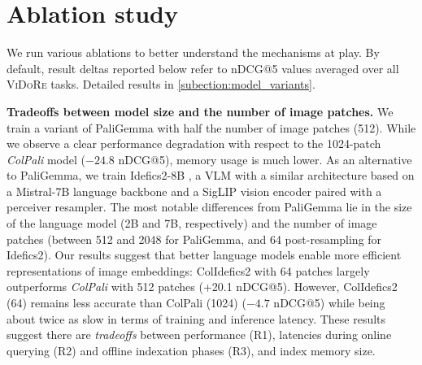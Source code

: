 \section{Ablation study}
\label{section:ablation_study}

We run various ablations to better understand the mechanisms at play. By default, result deltas reported below refer to nDCG@5 values averaged over all \textsc{ViDoRe} tasks.  Detailed results in \ref{subection:model_variants}.


\noindent\textbf{Tradeoffs between model size and the number of image patches.} We train a variant of PaliGemma with half the number of image patches (512). %
While we observe a clear performance degradation with respect to the 1024-patch \textit{ColPali} model ($-24.8$ nDCG@5), memory usage is much lower.
As an alternative to PaliGemma, we train Idefics2-8B , a VLM with a similar architecture based on a Mistral-7B  language backbone and a SigLIP vision encoder paired with a perceiver resampler. The most notable differences from PaliGemma lie in the size of the language model (2B and 7B, respectively) and the number of image patches (between 512 and 2048 for PaliGemma, and 64 post-resampling for Idefics2). Our results suggest that better language models enable more efficient representations of image embeddings: ColIdefics2 with 64 patches largely outperforms \textit{ColPali} with 512 patches (+20.1 nDCG@5). However, ColIdefics2 (64) remains less accurate than ColPali (1024) ($-4.7$ nDCG@5) while being about twice as slow in terms of training and inference latency.
%
These results suggest there are \textit{tradeoffs} between performance (R1), latencies during online querying (R2) and offline indexation phases (R3), and index memory size.

